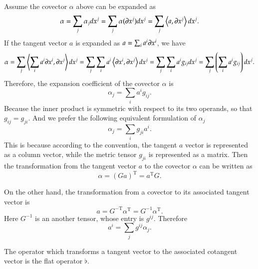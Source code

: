 \documentclass[11pt, a4paper]{book}
\begin{document}
Assume the covector $\alpha$ above can be expanded as
\begin{equation*}
  \alpha = \sum_j \alpha_j dx^j = \sum_j \alpha(\boldsymbol{\partial}x^j) dx^j = \sum_j
  \left\langle a, \boldsymbol{\partial}x^j \right\rangle dx^j.
\end{equation*}
If the tangent vector $a$ is expanded as $a = \sum_i a^i \boldsymbol{\partial}x^i$, we have
\begin{equation*}
  \alpha = \sum_j \left\langle \sum_i a^i \boldsymbol{\partial}x^i, \boldsymbol{\partial}x^j \right\rangle
  dx^j = \sum_j\sum_i a^i \left\langle \boldsymbol{\partial}x^i, \boldsymbol{\partial}x^j \right\rangle
  dx^j = \sum_j\sum_i a^i g_{ij} dx^j = \sum_j \left( \sum_i a^i g_{ij} \right) dx^j.
\end{equation*}
Therefore, the expansion coefficient of the covector $\alpha$ is
\begin{equation}
  \alpha_j = \sum_i a^i g_{ij}.
\end{equation}
Because the inner product is symmetric with respect to its two operands, so that $g_{ij} = g_{ji}$.
And we prefer the following equivalent formulation of $\alpha_j$
\begin{equation}
  \alpha_j = \sum_i g_{ji} a^i.
\end{equation}
This is because according to the convention, the tangent $a$ vector is represented as a
column vector, while the metric tensor $g_{ji}$ is represented as a matrix. Then the
transformation from the tangent vector $a$ to the covector $\alpha$ can be written as
\begin{equation}
  \alpha = (G a)^{\mathrm{T}} = a^{\mathrm{T}} G.
\end{equation}

On the other hand, the transformation from a covector to its associated tangent vector is
\begin{equation}
  a =  G^{-\mathrm{T}} \alpha^{\mathrm{T}} = G^{-1} \alpha^{\mathrm{T}}.
\end{equation}
Here $G^{-1}$ is an another tensor, whose entry is $g^{ij}$. Therefore
\begin{equation}
  a^i = \sum_{j} g^{ij} \alpha_j.
\end{equation}

\begin{Definition}
  \label{def:flat-operator}
  The operator which transforms a tangent vector to the associated cotangent vector is the
  flat operator $\flat$.
\end{Definition}
\end{document}
